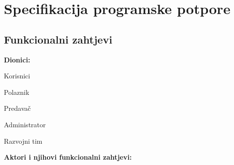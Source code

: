 \chapter{Specifikacija programske potpore}
		
	\section{Funkcionalni zahtjevi}
			
			\noindent \textbf{Dionici:}
			
			\begin{packed_enum}
				
				\item Korisnici			
				\begin{packed_enum}
					
					\item Polaznik
					\item Predavač	
				\end{packed_enum}
				\item Administrator			
				\item Razvojni tim
				
			\end{packed_enum}
			
			\noindent \textbf{Aktori i njihovi funkcionalni zahtjevi:}
			
